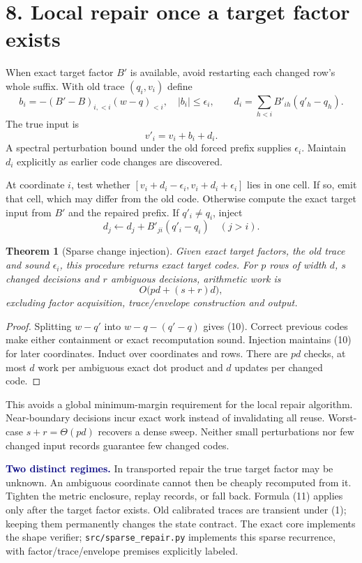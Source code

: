 \documentclass[11pt]{article}
\newtheorem{theorem}{Theorem}\newtheorem{lemma}{Lemma}\newtheorem{corollary}{Corollary}
\newcommand{\note}[1]{\textcolor{navy}{\textbf{#1}}}
\begin{document}
\newpage
\section*{8. Local repair once a target factor exists}
When exact target factor $B'$ is available, avoid restarting each changed row's whole suffix. With old trace $(q_i,v_i)$ define
\[
 b_i=-(B'-B)_{i,<i}(w-q)_{<i},\quad |b_i|\leq\epsilon_i,
 \qquad d_i=\sum_{h<i}B'_{ih}(q'_h-q_h).
\]
The true input is
\[
 v'_i=v_i+b_i+d_i. \tag{10}
\]
A spectral perturbation bound under the old forced prefix supplies $\epsilon_i$. Maintain $d_i$ explicitly as earlier code changes are discovered.

At coordinate $i$, test whether $[v_i+d_i-\epsilon_i,v_i+d_i+\epsilon_i]$ lies in one cell. If so, emit that cell, which may differ from the old code. Otherwise compute the exact target input from $B'$ and the repaired prefix. If $q'_i\ne q_i$, inject
\[
 d_j\leftarrow d_j+B'_{ji}(q'_i-q_i)\quad(j>i).
\]

\begin{theorem}[Sparse change injection]
Given exact target factors, the old trace and sound $\epsilon_i$, this procedure returns exact target codes. For $p$ rows of width $d$, $s$ changed decisions and $r$ ambiguous decisions, arithmetic work is
\[
 O\big(pd+(s+r)d\big), \tag{11}
\]
excluding factor acquisition, trace/envelope construction and output.
\end{theorem}
\begin{proof}
Splitting $w-q'$ into $w-q-(q'-q)$ gives (10). Correct previous codes make either containment or exact recomputation sound. Injection maintains (10) for later coordinates. Induct over coordinates and rows. There are $pd$ checks, at most $d$ work per ambiguous exact dot product and $d$ updates per changed code.
\end{proof}

This avoids a global minimum-margin requirement for the local repair algorithm. Near-boundary decisions incur exact work instead of invalidating all reuse. Worst-case $s+r=\Theta(pd)$ recovers a dense sweep. Neither small perturbations nor few changed input records guarantee few changed codes.

\note{Two distinct regimes.} In transported repair the true target factor may be unknown. An ambiguous coordinate cannot then be cheaply recomputed from it. Tighten the metric enclosure, replay records, or fall back. Formula (11) applies only after the target factor exists. Old calibrated traces are transient under (1); keeping them permanently changes the state contract. The exact core implements the shape verifier; \texttt{src/sparse\_repair.py} implements this sparse recurrence, with factor/trace/envelope premises explicitly labeled.
\end{document}
